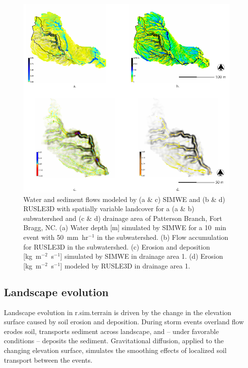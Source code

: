 \documentclass[gmd, manuscript]{copernicus}
\begin{document}
\begin{figure}
\center
\includegraphics[width=\textwidth,height=0.95\textheight,keepaspectratio]{figures/models.pdf}
\caption{Water and sediment flows 
modeled by (a \& c) SIMWE and (b \& d) RUSLE3D with spatially variable landcover 
for a (a \& b) subwatershed and (c \& d) drainage area of Patterson Branch, Fort Bragg, NC.
(a) Water depth [m] simulated by SIMWE for a 10~\unit{min} event with 50~\unit{mm~hr}$^{-1}$ in the subwatershed.
(b) Flow accumulation for RUSLE3D in the subwatershed.
(c) Erosion and deposition [\unit{kg~m}$^{-2}$~\unit{s}$^{-1}$] simulated by SIMWE in drainage area 1.
(d) Erosion [\unit{kg~m}$^{-2}$~\unit{s}$^{-1}$] modeled by RUSLE3D in drainage area 1.
}
\label{fig:models}
\end{figure}


\subsection{Landscape evolution}

Landscape evolution in r.sim.terrain 
is driven by the change in the elevation surface 
caused by soil erosion and deposition.
During storm events overland flow erodes soil, 
transports sediment across landscape, and 
-- under favorable conditions -- deposits the sediment. 
Gravitational diffusion, 
applied to the changing elevation surface, 
simulates the smoothing effects 
of localized soil transport between the events.
\end{document}
